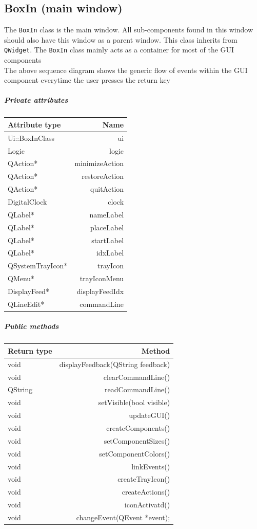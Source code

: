 \documentclass[12pt]{extarticle}
\begin{document}
\subsection{BoxIn (main window)}
The \texttt{BoxIn} class is the main window. All sub-components found in this window should also have this window as a parent window. This class inherits from \texttt{QWidget}. The \texttt{BoxIn} class mainly acts as a container for most of the GUI components\\
The above sequence diagram shows the generic flow of events within the GUI component everytime the user presses the return key\\
\subparagraph{Private attributes}
\begin{tabular}{l r}
Attribute type & Name\\
\hline
Ui::BoxInClass & ui\\
Logic & logic\\
QAction* & minimizeAction\\
QAction* & restoreAction\\
QAction* & quitAction\\
DigitalClock & clock\\
QLabel* & nameLabel\\
QLabel* & placeLabel\\
QLabel* & startLabel\\
QLabel* & idxLabel\\
QSystemTrayIcon* & trayIcon\\
QMenu* & trayIconMenu\\
DisplayFeed* & displayFeedIdx\\
QLineEdit* & commandLine\\
\end{tabular}
\subparagraph{Public methods}
\begin{tabular}{l r}
Return type & Method\\
\hline
void & displayFeedback(QString feedback)\\
void & clearCommandLine()\\
QString & readCommandLine()\\
void & setVisible(bool visible)\\
void & updateGUI()\\
void & createComponents()\\
void & setComponentSizes()\\
void & setComponentColors()\\
void & linkEvents()\\
void & createTrayIcon()\\
void & createActions()\\
void & iconActivatd()\\
void & changeEvent(QEvent *event);\\
\end{tabular}\\
\end{document}
